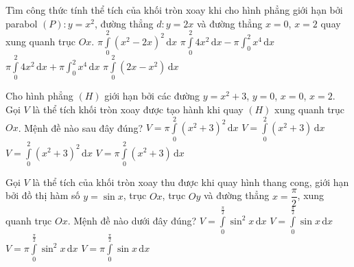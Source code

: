 \begin{ex}%
Tìm công thức tính thể tích của khối tròn xoay khi cho hình phẳng giới hạn bởi parabol $(P)\colon y=x^2$, đường thẳng $d\colon y=2 x$ và đường thẳng $x=0$, $x=2$ quay xung quanh trục $O x$.
\choice
{$\pi \displaystyle\int\limits_0^2\left(x^2-2 x\right)^2 \mathrm{\,d} x$}
{\True $\pi \displaystyle\int\limits_0^2 4 x^2 \mathrm{\,d} x-\pi \int_0^2 x^4 \mathrm{\,d} x$}
{ $\pi \displaystyle\int\limits_0^2 4 x^2 \mathrm{\,d} x+\pi \int_0^2 x^4 \mathrm{\,d} x$}
{$\pi \displaystyle\int\limits_0^2\left(2 x-x^2\right) \mathrm{\,d} x$}
\end{ex}

\begin{ex}%
 Cho hình phẳng $(H)$ giới hạn bởi các đường $y=x^2+3$, $y=0$, $x=0$, $x=2$. Gọi $V$ là thể tích khối tròn xoay được tạo hành khi quay $ (H) $ xung quanh trục $ Ox $. Mệnh đề nào sau đây đúng?
 \choice
 {\True $ V=\pi \displaystyle\int\limits_0^2 \left(x^2+3\right)^2 \mathrm{\,d}x $}
 {$ V=\displaystyle\int\limits_0^2 \left(x^2+3\right)\mathrm{\,d}x $}
 {$ V=\displaystyle\int\limits_0^2 \left(x^2+3\right)^2 \mathrm{\,d}x $}
 {$ V=\pi \displaystyle\int\limits_0^2 \left(x^2+3\right) \mathrm{\,d}x $}
\end{ex}
\begin{ex}%
	Gọi $V$ là thể tích của khối tròn xoay thu được khi quay hình thang cong, giới hạn bởi đồ thị hàm số $y=\sin x$, trục $Ox$, trục $Oy$ và đường thẳng $x=\dfrac{\pi}{2}$, xung quanh trục $Ox$. Mệnh đề nào dưới đây đúng?
	\choice
	{$V=\displaystyle\int\limits_0^{\tfrac{\pi}{2}}{\sin^2x\mathrm{\,d}x}$}
	{$V=\displaystyle\int\limits_0^{\tfrac{\pi}{2}}{\sin x\mathrm{\,d}x}$}
	{\True $V=\pi\displaystyle\int\limits_0^{\tfrac{\pi}{2}}{\sin^2x\mathrm{\,d}x}$}
	{$V=\pi\displaystyle\int\limits_0^{\tfrac{\pi}{2}}{\sin x\mathrm{\,d}x}$}
\end{ex}

